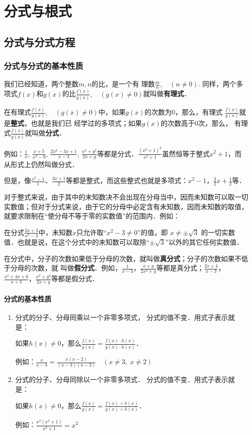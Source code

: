 \chapter{分式与根式}
\section{分式与分式方程}
\subsection{分式与分式的基本性质}
我们已经知道，两个整数$m,n$的比，是一个有
理数$\frac{m}{n},\quad (n\ne 0)$. 同样，两个多项式$f(x)$和$g(x)$的比$\frac{f(x)}{g(x)},\quad (g(x)\ne 0)$就叫做\textbf{有理式}．

在有理式$\frac{f(x)}{g(x)},\quad (g(x)\ne 0)$中，如果$g(x)$的次数为0，那么，有理式
$\frac{f(x)}{g(x)}$就是\textbf{整式}，也就是我们已
经学过的多项式；如果$g(x)$的次数高于0次，那么，
有理式$\frac{f(x)}{g(x)}$就叫做\textbf{分式}．

例如：$\frac{1}{x}$, $\frac{x+5}{x^2-9}$, $\frac{2x^2-3x+1}{x-3}$, $\frac{x^2+y^2}{2x+y}$等都是分式．$\frac{(x^2+1)^2}{x^2+1}$虽然恒等于整式$x^2+1$，而从形式上仍然叫做分式．

但是，像$\frac{x^2-1}{1}$、$\frac{3x+1}{2}$等都是整式，而这些整式也就是多项式：$x^2-1$，$\frac{3}{2}x+\frac{1}{2}$等．

对于整式来说，由于其中的未知数决不会出现在分母当中，因而未知数可以取一切实数值；但对于分式来说，由于它的分母中必定含有未知数，因而未知数的取值，就要求限制在“使分母不等于零的实数值”的范围内．例如：

在分式$\frac{2x+3}{x^2-3}$中，未知数$x$只允许取“$x^2-3\ne 0$”的值，即
$x\ne \pm\sqrt{3}$
的一切实数值．也就是说，在这个分式中的未知数可以取除“$\pm\sqrt{3}$”以外的其它任何实数值．

在分式中，分子的次数如果低于分母的次数，就叫做\textbf{真分式}；分子的次数如果不低于分母的次数，就
叫做\textbf{假分式}．例如，$\frac{1}{x-3}$，$\frac{x+y}{2x^2+y}$等都是真分式；$\frac{2x+4}{x-3}$，$\frac{x^2+4x+6}{x+3}$，$\frac{x^2+y^2}{2x+y}$等都是假分式．

\subsubsection{分式的基本性质}

\begin{enumerate}
\item 分式的分子、分母同乘以一个非零多项式，
分式的值不变．用式子表示就是：

如果$h(x)\ne 0$，那么$\frac{f(x)}{g(x)}=\frac{f(x)\cdot h(x)}{g(x)\cdot h(x)}$．

例如：$\frac{x}{x-3}=\frac{x(x-2)}{(x-3)(x-2)}\quad (x\ne 3,\; x\ne 2)$

\item 分式的分子、分母同除以一个非零多项式．
分式的值不变．用式子表示就是：

如果$h(x)\ne 0$，那么$\frac{f(x)}{g(x)}=\frac{f(x)\div h(x)}{g(x)\div h(x)}$．

例如：$\frac{x^2(x^2+1)}{x^2+1}=x^2$
\end{enumerate}

